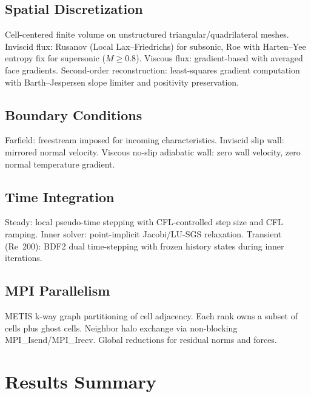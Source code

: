 \documentclass[11pt]{article}
\begin{document}
\subsection{Spatial Discretization}
Cell-centered finite volume on unstructured triangular/quadrilateral meshes.
Inviscid flux: Rusanov (Local Lax--Friedrichs) for subsonic, Roe with
Harten--Yee entropy fix for supersonic ($M \ge 0.8$). Viscous flux:
gradient-based with averaged face gradients. Second-order reconstruction:
least-squares gradient computation with Barth--Jespersen slope limiter and
positivity preservation.

\subsection{Boundary Conditions}
Farfield: freestream imposed for incoming characteristics.
Inviscid slip wall: mirrored normal velocity.
Viscous no-slip adiabatic wall: zero wall velocity, zero normal temperature gradient.

\subsection{Time Integration}
Steady: local pseudo-time stepping with CFL-controlled step size and
CFL ramping. Inner solver: point-implicit Jacobi/LU-SGS relaxation.
Transient (Re~200): BDF2 dual time-stepping with frozen history states
during inner iterations.

\subsection{MPI Parallelism}
METIS k-way graph partitioning of cell adjacency. Each rank owns a subset
of cells plus ghost cells. Neighbor halo exchange via non-blocking
MPI\_Isend/MPI\_Irecv. Global reductions for residual norms and forces.

\section{Results Summary}
\end{document}
